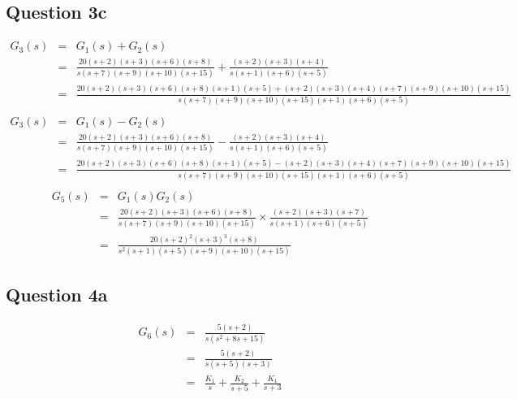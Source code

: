 \documentclass[12pt, a4paper]{article}
\begin{document}
		\subsection*{Question 3c}
		\label{sub:question_3c}
		\begin{equation*}
			\begin{array}{rcl}
				G_3(s) & = & G_1(s)+G_2(s)\\
				& = & \frac{20(s+2)(s+3)(s+6)(s+8)}{s(s+7)(s+9)(s+10)(s+15)} + \frac{(s+2)(s+3)(s+4)}{s(s+1)(s+6)(s+5)}\\
				& = & \frac{20(s+2)(s+3)(s+6)(s+8)(s+1)(s+5)+(s+2)(s+3)(s+4)(s+7)(s+9)(s+10)(s+15)}{s(s+7)(s+9)(s+10)(s+15)(s+1)(s+6)(s+5)}\\
			\end{array}
		\end{equation*}
		\begin{equation*}
			\begin{array}{rcl}
				G_3(s) & = & G_1(s)-G_2(s)\\
				& = & \frac{20(s+2)(s+3)(s+6)(s+8)}{s(s+7)(s+9)(s+10)(s+15)} - \frac{(s+2)(s+3)(s+4)}{s(s+1)(s+6)(s+5)}\\
				& = & \frac{20(s+2)(s+3)(s+6)(s+8)(s+1)(s+5)-(s+2)(s+3)(s+4)(s+7)(s+9)(s+10)(s+15)}{s(s+7)(s+9)(s+10)(s+15)(s+1)(s+6)(s+5)}\\
			\end{array}
		\end{equation*}
		\begin{equation*}
			\begin{array}{rcl}
				G_5(s) & = & G_1(s)G_2(s)\\
				& = & \frac{20(s+2)(s+3)(s+6)(s+8)}{s(s+7)(s+9)(s+10)(s+15)}{} \times \frac{(s+2)(s+3)(s+7)}{s(s+1)(s+6)(s+5)}\\
				& = & \frac{20(s+2)^2(s+3)^3(s+8)}{s^2(s+1)(s+5)(s+9)(s+10)(s+15)}
			\end{array}
		\end{equation*}

	\subsection*{Question 4a}
		\label{sub:question_4a}
		\begin{equation*}
			\begin{array}{rcl}
				G_6(s) & = & \frac{5(s+2)}{s(s^2+8s+15)}\\
				& = & \frac{5(s+2)}{s(s+5)(s+3)}\\
				& = & \frac{K_1}{s} + \frac{K_2}{s+5} + \frac{K_1}{s+3}
			\end{array}
		\end{equation*}
\end{document}
